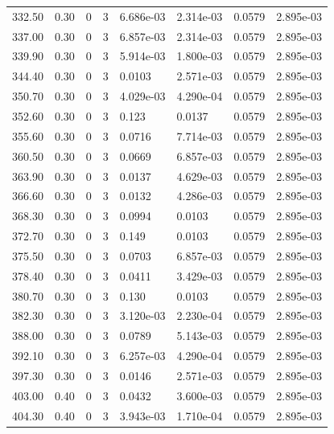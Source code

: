 \documentclass[preview]{standalone}
\begin{document}
{{{{\begin{tabular}{L{1.2cm}C{1.2cm} C{0.3cm}C{0.5cm} C{1.4cm}C{1.4cm} C{1.4cm}C{1.4cm}}
  332.50  &  0.30  & 0     &  3 &  6.686e-03  & 2.314e-03  & 0.0579 &  2.895e-03   \\ 
  337.00  &  0.30  & 0     &  3 &  6.857e-03  & 2.314e-03  & 0.0579 &  2.895e-03   \\ 
  339.90  &  0.30  & 0     &  3 &  5.914e-03  & 1.800e-03  & 0.0579 &  2.895e-03   \\ 
  344.40  &  0.30  & 0     &  3 &  0.0103  & 2.571e-03  & 0.0579 &  2.895e-03   \\ 
  350.70  &  0.30  & 0     &  3 &  4.029e-03  & 4.290e-04  & 0.0579 &  2.895e-03   \\ 
  352.60  &  0.30  & 0     &  3 &  0.123  & 0.0137  & 0.0579 &  2.895e-03   \\ 
  355.60  &  0.30  & 0     &  3 &  0.0716  & 7.714e-03  & 0.0579 &  2.895e-03   \\ 
  360.50  &  0.30  & 0     &  3 &  0.0669  & 6.857e-03  & 0.0579 &  2.895e-03   \\ 
  363.90  &  0.30  & 0     &  3 &  0.0137  & 4.629e-03  & 0.0579 &  2.895e-03   \\ 
  366.60  &  0.30  & 0     &  3 &  0.0132  & 4.286e-03  & 0.0579 &  2.895e-03   \\ 
  368.30  &  0.30  & 0     &  3 &  0.0994  & 0.0103  & 0.0579 &  2.895e-03   \\ 
  372.70  &  0.30  & 0     &  3 &  0.149  & 0.0103  & 0.0579 &  2.895e-03   \\ 
  375.50  &  0.30  & 0     &  3 &  0.0703  & 6.857e-03  & 0.0579 &  2.895e-03   \\ 
  378.40  &  0.30  & 0     &  3 &  0.0411  & 3.429e-03  & 0.0579 &  2.895e-03   \\ 
  380.70  &  0.30  & 0     &  3 &  0.130  & 0.0103  & 0.0579 &  2.895e-03   \\ 
  382.30  &  0.30  & 0     &  3 &  3.120e-03  & 2.230e-04  & 0.0579 &  2.895e-03   \\ 
  388.00  &  0.30  & 0     &  3 &  0.0789  & 5.143e-03  & 0.0579 &  2.895e-03   \\ 
  392.10  &  0.30  & 0     &  3 &  6.257e-03  & 4.290e-04  & 0.0579 &  2.895e-03   \\ 
  397.30  &  0.30  & 0     &  3 &  0.0146  & 2.571e-03  & 0.0579 &  2.895e-03   \\ 
  403.00  &  0.40  & 0     &  3 &  0.0432  & 3.600e-03  & 0.0579 &  2.895e-03   \\ 
  404.30  &  0.40  & 0     &  3 &  3.943e-03  & 1.710e-04  & 0.0579 &  2.895e-03   \\ 

\end{tabular}}}}}
\end{document}
